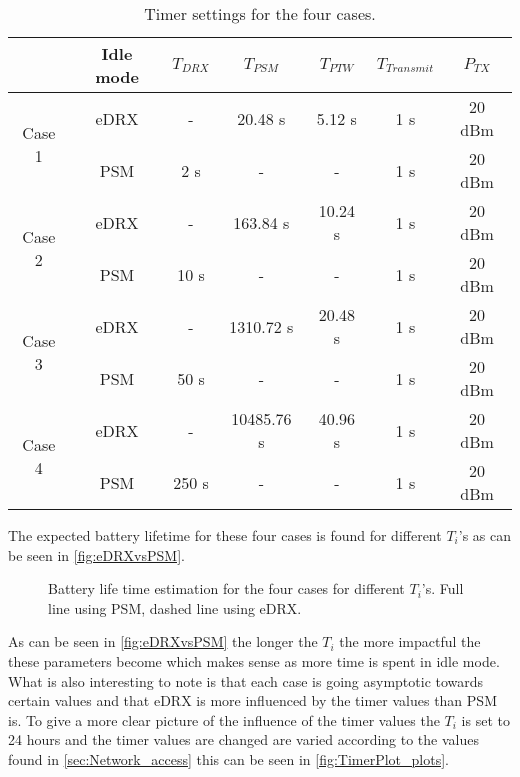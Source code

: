 \begin{table}[H]
\centering
\begin{tabular}{|c|c|c|c|c|c|c|} \hline
				& Idle mode & $T_{DRX}$	& $T_{PSM}$	& $T_{PTW}$	& $T_{Transmit}$	& $P_{TX}$ 	\\ \hline
\multirow{2}{*}{Case 1}	& eDRX & - 		& 20.48 s	& 5.12 s	& 1 s				& 20 dBm	\\ \cline{2-7}
						& PSM  & 2 s 	& -			& -			& 1 s				& 20 dBm	\\ \hline
\multirow{2}{*}{Case 2}	& eDRX & -		& 163.84 s	& 10.24 s	& 1 s				& 20 dBm	\\ \cline{2-7}
						& PSM  & 10 s	& -			& -			& 1 s				& 20 dBm	\\ \hline
\multirow{2}{*}{Case 3}	& eDRX & -		& 1310.72 s	& 20.48 s	& 1 s				& 20 dBm	\\ \cline{2-7}
						& PSM  & 50 s	& -			& -			& 1 s				& 20 dBm	\\ \hline
\multirow{2}{*}{Case 4}	& eDRX & -		& 10485.76 s& 40.96 s	& 1 s				& 20 dBm	\\ \cline{2-7}
						& PSM  & 250 s	& -			& -			& 1 s				& 20 dBm	\\ \hline
\end{tabular}
\caption{Timer settings for the four cases.}
\label{tab:case_description}
\end{table}

The expected battery lifetime for these four cases is found for different $T_i$'s as can be seen in \autoref{fig:eDRXvsPSM}.

\begin{figure}[H]
\centering
{}
\resizebox{0.7\textwidth}{!}{
}
\caption{Battery life time estimation for the four cases for different $T_i$'s. Full line using PSM, dashed line using eDRX.}
\label{fig:eDRXvsPSM}
\end{figure}

As can be seen in \autoref{fig:eDRXvsPSM} the longer the $T_i$ the more impactful the these parameters become which makes sense as more time is spent in idle mode. What is also interesting to note is that each case is going asymptotic towards certain values and that eDRX is more influenced by the timer values than PSM is. To give a more clear picture of the influence of the timer values the $T_i$ is set to 24 hours and the timer values are changed are varied according to the values found in \autoref{sec:Network_access} this can be seen in \autoref{fig:TimerPlot_plots}.


